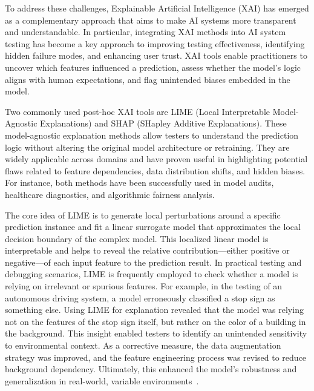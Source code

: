 \documentclass[manuscript,screen,review]{acmart}
\begin{document}
To address these challenges, Explainable Artificial Intelligence (XAI) has emerged as a complementary approach that aims to make AI systems more transparent and understandable. In particular, integrating XAI methods into AI system testing has become a key approach to improving testing effectiveness, identifying hidden failure modes, and enhancing user trust. XAI tools enable practitioners to uncover which features influenced a prediction, assess whether the model’s logic aligns with human expectations, and flag unintended biases embedded in the model.

Two commonly used post-hoc XAI tools are LIME (Local Interpretable Model-Agnostic Explanations) and SHAP (SHapley Additive Explanations). These model-agnostic explanation methods allow testers to understand the prediction logic without altering the original model architecture or retraining. They are widely applicable across domains and have proven useful in highlighting potential flaws related to feature dependencies, data distribution shifts, and hidden biases. For instance, both methods have been successfully used in model audits, healthcare diagnostics, and algorithmic fairness analysis.

The core idea of LIME is to generate local perturbations around a specific prediction instance and fit a linear surrogate model that approximates the local decision boundary of the complex model. This localized linear model is interpretable and helps to reveal the relative contribution---either positive or negative---of each input feature to the prediction result. In practical testing and debugging scenarios, LIME is frequently employed to check whether a model is relying on irrelevant or spurious features. For example, in the testing of an autonomous driving system, a model erroneously classified a stop sign as something else. Using LIME for explanation revealed that the model was relying not on the features of the stop sign itself, but rather on the color of a building in the background. This insight enabled testers to identify an unintended sensitivity to environmental context. As a corrective measure, the data augmentation strategy was improved, and the feature engineering process was revised to reduce background dependency. Ultimately, this enhanced the model’s robustness and generalization in real-world, variable environments~\cite{Ribeiro2016}.
\end{document}
